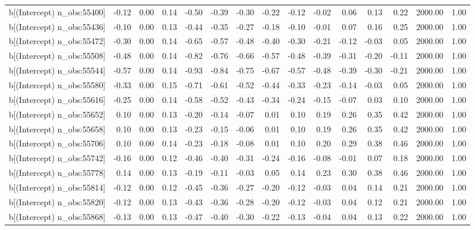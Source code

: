 \begin{table}[ht]
\begin{tabular}{rrrrrrrrrrrrrrr}
  b[(Intercept) n\_obs:55400] & -0.12 & 0.00 & 0.14 & -0.50 & -0.39 & -0.30 & -0.22 & -0.12 & -0.02 & 0.06 & 0.13 & 0.22 & 2000.00 & 1.00 \\ 
  b[(Intercept) n\_obs:55436] & -0.10 & 0.00 & 0.13 & -0.44 & -0.35 & -0.27 & -0.18 & -0.10 & -0.01 & 0.07 & 0.16 & 0.25 & 2000.00 & 1.00 \\ 
  b[(Intercept) n\_obs:55472] & -0.30 & 0.00 & 0.14 & -0.65 & -0.57 & -0.48 & -0.40 & -0.30 & -0.21 & -0.12 & -0.03 & 0.05 & 2000.00 & 1.00 \\ 
  b[(Intercept) n\_obs:55508] & -0.48 & 0.00 & 0.14 & -0.82 & -0.76 & -0.66 & -0.57 & -0.48 & -0.39 & -0.31 & -0.20 & -0.11 & 2000.00 & 1.00 \\ 
  b[(Intercept) n\_obs:55544] & -0.57 & 0.00 & 0.14 & -0.93 & -0.84 & -0.75 & -0.67 & -0.57 & -0.48 & -0.39 & -0.30 & -0.21 & 2000.00 & 1.00 \\ 
  b[(Intercept) n\_obs:55580] & -0.33 & 0.00 & 0.15 & -0.71 & -0.61 & -0.52 & -0.44 & -0.33 & -0.23 & -0.14 & -0.03 & 0.05 & 2000.00 & 1.00 \\ 
  b[(Intercept) n\_obs:55616] & -0.25 & 0.00 & 0.14 & -0.58 & -0.52 & -0.43 & -0.34 & -0.24 & -0.15 & -0.07 & 0.03 & 0.10 & 2000.00 & 1.00 \\ 
  b[(Intercept) n\_obs:55652] & 0.10 & 0.00 & 0.13 & -0.20 & -0.14 & -0.07 & 0.01 & 0.10 & 0.19 & 0.26 & 0.35 & 0.42 & 2000.00 & 1.00 \\ 
  b[(Intercept) n\_obs:55658] & 0.10 & 0.00 & 0.13 & -0.23 & -0.15 & -0.06 & 0.01 & 0.10 & 0.19 & 0.26 & 0.35 & 0.42 & 2000.00 & 1.00 \\ 
  b[(Intercept) n\_obs:55706] & 0.10 & 0.00 & 0.14 & -0.23 & -0.18 & -0.08 & 0.01 & 0.10 & 0.20 & 0.29 & 0.38 & 0.46 & 2000.00 & 1.00 \\ 
  b[(Intercept) n\_obs:55742] & -0.16 & 0.00 & 0.12 & -0.46 & -0.40 & -0.31 & -0.24 & -0.16 & -0.08 & -0.01 & 0.07 & 0.18 & 2000.00 & 1.00 \\ 
  b[(Intercept) n\_obs:55778] & 0.14 & 0.00 & 0.13 & -0.19 & -0.11 & -0.03 & 0.05 & 0.14 & 0.23 & 0.30 & 0.38 & 0.46 & 2000.00 & 1.00 \\ 
  b[(Intercept) n\_obs:55814] & -0.12 & 0.00 & 0.12 & -0.45 & -0.36 & -0.27 & -0.20 & -0.12 & -0.03 & 0.04 & 0.14 & 0.21 & 2000.00 & 1.00 \\ 
  b[(Intercept) n\_obs:55820] & -0.12 & 0.00 & 0.13 & -0.43 & -0.36 & -0.28 & -0.20 & -0.12 & -0.03 & 0.04 & 0.12 & 0.21 & 2000.00 & 1.00 \\ 
  b[(Intercept) n\_obs:55868] & -0.13 & 0.00 & 0.13 & -0.47 & -0.40 & -0.30 & -0.22 & -0.13 & -0.04 & 0.04 & 0.13 & 0.22 & 2000.00 & 1.00 \\ 

\end{tabular}
\end{table}
